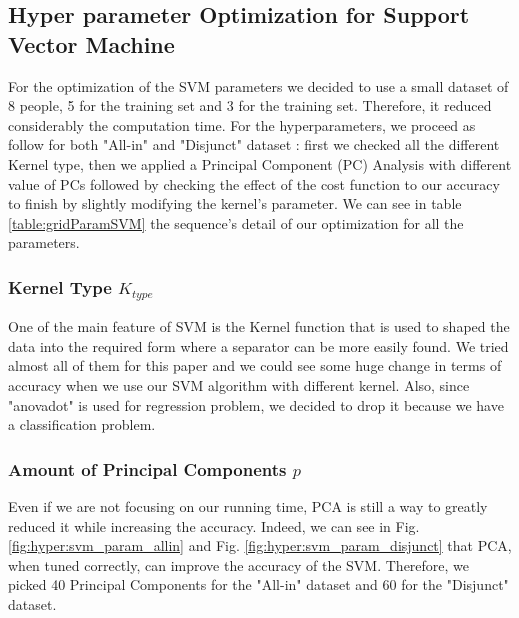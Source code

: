 \documentclass[conference]{IEEEtran}
\begin{document}
\subsection{Hyper parameter Optimization for Support Vector Machine}\label{sec:hyper:svm}
\textcolor{maxim}{
    For the optimization of the SVM parameters we decided to use a small dataset of 8 people, 5 for the training set and 3 for the training set. Therefore, it reduced considerably the computation time. For the hyperparameters, we proceed as follow for both "All-in" and "Disjunct" dataset : first we checked all the different Kernel type, then we applied a Principal Component (PC) Analysis with different value of PCs followed by checking the effect of the cost function to our accuracy to finish by slightly modifying the kernel's parameter. We can see in table \ref{table:gridParamSVM} the sequence's detail of our optimization for all the parameters.\\
    \subsubsection{Kernel Type $K_{type}$}
    One of the main feature of SVM is the Kernel function that is used to shaped the data into the required form where a separator can be more easily found. We tried almost all of them for this paper and we could see some huge change in terms of accuracy when we use our SVM algorithm with different kernel. Also, since "anovadot" is used for regression problem, we decided to drop it because we have a classification problem. \\
    \subsubsection{Amount of Principal Components $p$}
    Even if we are not focusing on our running time, PCA is still a way to greatly reduced it while increasing the accuracy. Indeed, we can see in Fig. \ref{fig:hyper:svm_param_allin} and Fig. \ref{fig:hyper:svm_param_disjunct} that PCA, when tuned correctly, can improve the accuracy of the SVM. Therefore, we picked 40 Principal Components for the "All-in" dataset and 60 for the "Disjunct" dataset.
}
\end{document}
